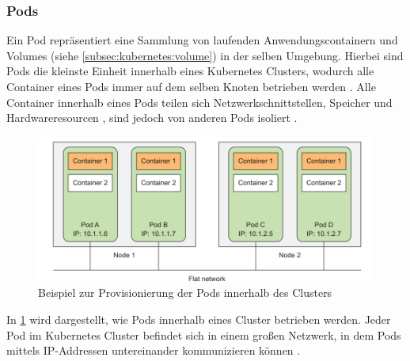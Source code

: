 \subsubsection{Pods}
\label{subsec:kubernetes:pods}
Ein Pod repräsentiert eine Sammlung von laufenden Anwendungscontainern 
und Volumes (siehe \ref{subsec:kubernetes:volume}) in der selben Umgebung.
Hierbei sind Pods die kleinste Einheit innerhalb eines Kubernetes Clusters, wodurch alle Container eines Pods
immer auf dem selben Knoten betrieben werden \cite{Burns2019}.
Alle Container innerhalb eines Pods teilen sich Netzwerkschnittstellen, Speicher und Hardwareresourcen \cite{kubernetesPods},
sind jedoch von anderen Pods isoliert \cite{Burns2019}.

\begin{figure}[h]
  \includegraphics[width=\textwidth]{gfx/chapters/2_grundlagen/kubernetes_network.png}
  \caption{Beispiel zur Provisionierung der Pods innerhalb des Clusters}
  \label{fig:kubernetes_network}
\end{figure}

In \ref{fig:kubernetes_network} wird dargestellt, wie Pods innerhalb eines Cluster betrieben werden.
Jeder Pod im Kubernetes Cluster befindet sich in einem großen Netzwerk, in dem Pods mittels IP-Addressen untereinander 
kommunizieren können \cite{Marko2018}. 


